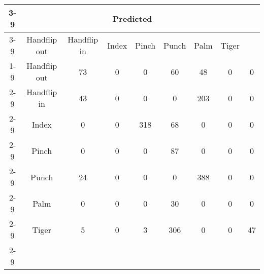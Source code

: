 \documentclass{standalone}
\begin{document}
 
 \begin{tabular}{|c |c |c |c |c |c |c |c |c |}
\cline{3-9}\multicolumn{2}{c|}{} & \multicolumn{7}{c|}{Predicted} \\ 
\cline{3-9} \multicolumn{2}{c |}{ } & Handflip out & Handflip in & Index & Pinch & Punch & Palm & Tiger\\ 
\cline{1-9}\multirow{7}{*}{\rotatebox[origin=c]{90}{Actual}} & Handflip out & 73 & 0 & 0 & 60 & 48 & 0 & 0\\ 
 \cline{2-9} & Handflip in & 43 & 0 & 0 & 0 & 203 & 0 & 0\\ 
 \cline{2-9} & Index & 0 & 0 & 318 & 68 & 0 & 0 & 0\\ 
 \cline{2-9} & Pinch & 0 & 0 & 0 & 87 & 0 & 0 & 0\\ 
 \cline{2-9} & Punch & 24 & 0 & 0 & 0 & 388 & 0 & 0\\ 
 \cline{2-9} & Palm & 0 & 0 & 0 & 30 & 0 & 0 & 0\\ 
 \cline{2-9} & Tiger & 5 & 0 & 3 & 306 & 0 & 0 & 47\\ 
 \cline{2-9}\hline \end{tabular}
 
\end{document}
